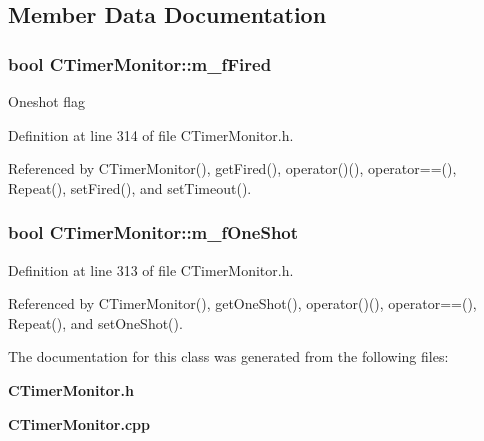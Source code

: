 \subsection{Member Data Documentation}
\subsubsection{\setlength{\rightskip}{0pt plus 5cm}bool CTimer\-Monitor::m\_\-f\-Fired\hspace{0.3cm}{\tt  [private]}}\label{classCTimerMonitor_o1}


Oneshot flag 

Definition at line 314 of file CTimer\-Monitor.h.

Referenced by CTimer\-Monitor(), get\-Fired(), operator()(), operator==(), Repeat(), set\-Fired(), and set\-Timeout().
\subsubsection{\setlength{\rightskip}{0pt plus 5cm}bool CTimer\-Monitor::m\_\-f\-One\-Shot\hspace{0.3cm}{\tt  [private]}}\label{classCTimerMonitor_o0}




Definition at line 313 of file CTimer\-Monitor.h.

Referenced by CTimer\-Monitor(), get\-One\-Shot(), operator()(), operator==(), Repeat(), and set\-One\-Shot().

The documentation for this class was generated from the following files:\begin{CompactItemize}
\item 
{\bf CTimer\-Monitor.h}\item 
{\bf CTimer\-Monitor.cpp}\end{CompactItemize}
